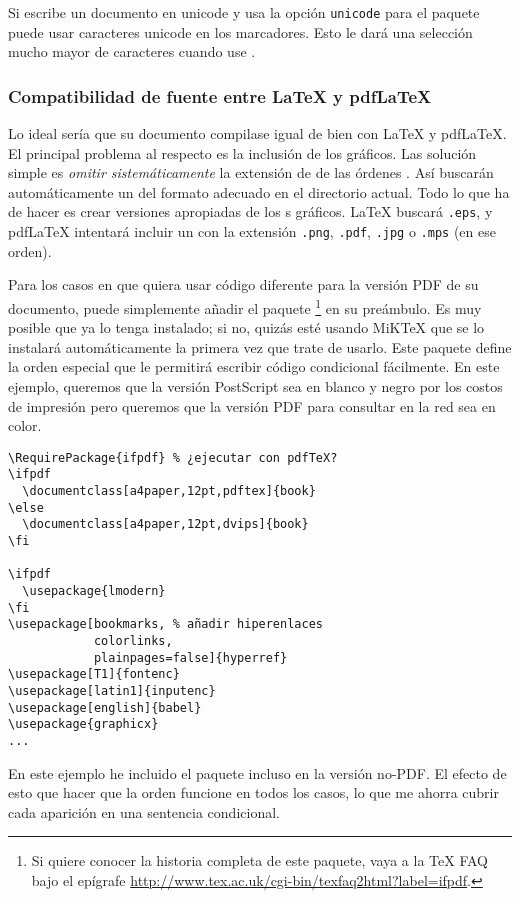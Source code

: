 Si escribe un documento en unicode y usa la opción \verb+unicode+ para el paquete  puede usar caracteres unicode en los marcadores.  Esto le dará una selección mucho mayor de caracteres cuando use .

\subsubsection{Compatibilidad de fuente entre \LaTeX{} y pdf\LaTeX{}}
\label{sec:pdfcompat}

Lo ideal sería que su documento compilase igual de bien con \LaTeX{} y pdf\LaTeX{}.  El principal problema al respecto es la inclusión de los gráficos.  Las solución simple es  \emph{omitir sistemáticamente} la extensión de \filenomo{} de las órdenes .  Así buscarán automáticamente un \filenomo{} del formato adecuado en el directorio actual.  Todo lo que ha de hacer es crear versiones apropiadas de los \filenomo{}s gráficos.  \LaTeX{} buscará \texttt{.eps}, y  pdf\LaTeX{} intentará incluir un \filenomo{} con la extensión \texttt{.png}, \texttt{.pdf}, \texttt{.jpg} o \texttt{.mps} (en ese orden).

Para los casos en que quiera usar código diferente para la versión PDF de su documento, puede simplemente añadir el paquete  \footnote{Si quiere conocer la historia completa de este paquete, vaya a la \TeX{} FAQ bajo el epígrafe \url{http://www.tex.ac.uk/cgi-bin/texfaq2html?label=ifpdf}.}  en su preámbulo.  Es muy posible que ya lo tenga instalado; si no, quizás esté usando MiK\TeX{} que se lo instalará automáticamente la primera vez que trate de usarlo.  Este paquete define la orden especial  que le permitirá escribir código condicional fácilmente. En este ejemplo, queremos que la versión PostScript sea en blanco y negro por los costos de impresión pero queremos que la versión PDF para consultar en la red sea en color.
\begin{code}
\begin{verbatim}
\RequirePackage{ifpdf} % ¿ejecutar con pdfTeX?
\ifpdf
  \documentclass[a4paper,12pt,pdftex]{book}
\else
  \documentclass[a4paper,12pt,dvips]{book}
\fi

\ifpdf
  \usepackage{lmodern}
\fi
\usepackage[bookmarks, % añadir hiperenlaces
            colorlinks,
            plainpages=false]{hyperref}                    
\usepackage[T1]{fontenc}
\usepackage[latin1]{inputenc}
\usepackage[english]{babel}
\usepackage{graphicx}
...
\end{verbatim}
\end{code}
En este ejemplo he incluido el paquete  incluso en la versión no-PDF.  El efecto de esto que hacer que la orden   funcione en todos los casos, lo que me ahorra cubrir cada aparición en una sentencia condicional.

